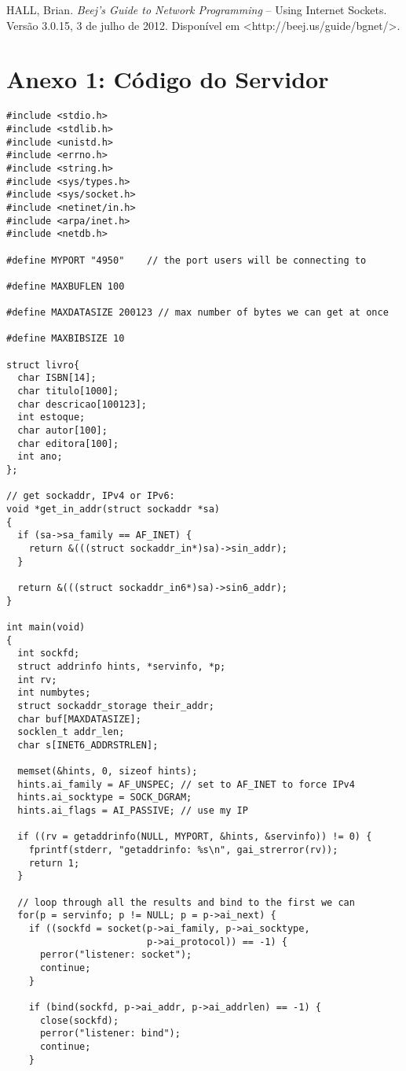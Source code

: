 \documentclass[11pt, brazil]{article} %
\begin{document}
HALL, Brian. \emph{Beej's Guide to Network Programming} -- Using Internet Sockets. Versão 3.0.15, 3 de julho de 2012. Disponível em <http://beej.us/guide/bgnet/>.

\section*{Anexo 1: Código do Servidor}

\begin{verbatim}
#include <stdio.h>
#include <stdlib.h>
#include <unistd.h>
#include <errno.h>
#include <string.h>
#include <sys/types.h>
#include <sys/socket.h>
#include <netinet/in.h>
#include <arpa/inet.h>
#include <netdb.h>

#define MYPORT "4950"    // the port users will be connecting to

#define MAXBUFLEN 100

#define MAXDATASIZE 200123 // max number of bytes we can get at once

#define MAXBIBSIZE 10

struct livro{
  char ISBN[14];
  char titulo[1000];
  char descricao[100123];
  int estoque;
  char autor[100];
  char editora[100];
  int ano;
};

// get sockaddr, IPv4 or IPv6:
void *get_in_addr(struct sockaddr *sa)
{
  if (sa->sa_family == AF_INET) {
    return &(((struct sockaddr_in*)sa)->sin_addr);
  }

  return &(((struct sockaddr_in6*)sa)->sin6_addr);
}

int main(void)
{
  int sockfd;
  struct addrinfo hints, *servinfo, *p;
  int rv;
  int numbytes;
  struct sockaddr_storage their_addr;
  char buf[MAXDATASIZE];
  socklen_t addr_len;
  char s[INET6_ADDRSTRLEN];

  memset(&hints, 0, sizeof hints);
  hints.ai_family = AF_UNSPEC; // set to AF_INET to force IPv4
  hints.ai_socktype = SOCK_DGRAM;
  hints.ai_flags = AI_PASSIVE; // use my IP

  if ((rv = getaddrinfo(NULL, MYPORT, &hints, &servinfo)) != 0) {
    fprintf(stderr, "getaddrinfo: %s\n", gai_strerror(rv));
    return 1;
  }

  // loop through all the results and bind to the first we can
  for(p = servinfo; p != NULL; p = p->ai_next) {
    if ((sockfd = socket(p->ai_family, p->ai_socktype,
                         p->ai_protocol)) == -1) {
      perror("listener: socket");
      continue;
    }

    if (bind(sockfd, p->ai_addr, p->ai_addrlen) == -1) {
      close(sockfd);
      perror("listener: bind");
      continue;
    }


\end{verbatim}
\end{document}
